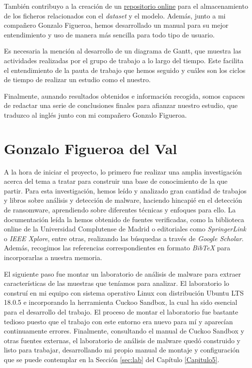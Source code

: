 También contribuyo a la creación de un \href{https://gitlab.fdi.ucm.es/marina.lopez/tfg-ransomware-20-21}{repositorio online} para el almacenamiento de los ficheros relacionados con el \textit{dataset} y el modelo. Además, junto a mi compañero Gonzalo Figueroa, hemos desarrollado un manual para su mejor entendimiento y uso de manera más sencilla para todo tipo de usuario.

Es necesaria la mención al desarrollo de un diagrama de Gantt, que muestra las actividades realizadas por el grupo de trabajo a lo largo del tiempo. Este facilita el entendimiento de la pauta de trabajo que hemos seguido y cuáles son los ciclos de tiempo de realizar un estudio como el nuestro.

Finalmente, aunando resultados obtenidos e información recogida, somos capaces de redactar una serie de conclusiones finales para afianzar nuestro estudio, que traduzco al inglés junto con mi compañero Gonzalo Figueroa.

\newpage
\section{Gonzalo Figueroa del Val}
\noindent A la hora de iniciar el proyecto, lo primero fue realizar una amplia investigación acerca del tema a tratar para construir una base de conocimiento de la que partir. Para esta investigación, hemos leído y analizado gran cantidad de trabajos y libros sobre análisis y detección de malware, haciendo hincapié en el detección de ransomware, aprendiendo sobre diferentes técnicas y enfoques para ello. La documentación leída la hemos obtenido de fuentes verificadas, como la biblioteca online de la Universidad Complutense de Madrid o editoriales como \textit{SpringerLink} o \textit{IEEE Xplore}, entre otras, realizando las búsquedas a través de \textit{Google Scholar}. Además, recogimos las referencias correspondientes en formato \textit{BibTeX} para incorporarlas a nuestra memoria.

El siguiente paso fue montar un laboratorio de análisis de malware para extraer características de las muestras que teníamos para analizar. El laboratorio lo construí en mi equipo con sistema operativo Linux con distribución Ubuntu LTS 18.0.5 e incorporando la herramienta Cuckoo Sandbox, la cual ha sido esencial para el desarrollo del trabajo. El proceso de montar el laboratorio fue bastante tedioso puesto que el trabajo con este entorno era nuevo para mí y aparecían continuamente errores. Finalmente, consultando el manual de Cuckoo Sandbox y otras fuentes externas, el laboratorio de análisis de malware quedó construido y listo para trabajar, desarrollando mi propio manual de montaje y configuración que se puede contemplar en la Sección \ref{sec:lab} del Capítulo \ref{Capitulo5}.


